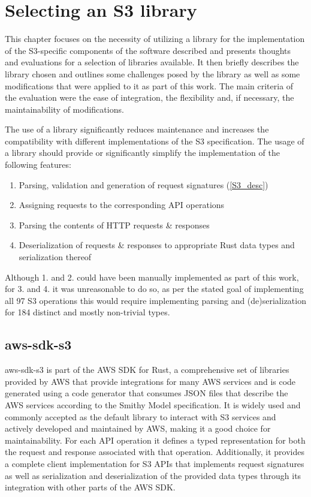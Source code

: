 \chapter{Selecting an S3 library}

This chapter focuses on the necessity of utilizing a library for the implementation of the S3-specific components of the software described and presents thoughts and evaluations for a selection of libraries available. It then briefly describes the library chosen and outlines some challenges posed by the library as well as some modifications that were applied to it as part of this work. The main criteria of the evaluation were the ease of integration, the flexibility and, if necessary, the maintainability of modifications.

The use of a library significantly reduces maintenance and increases the compatibility with different implementations of the S3 specification. The usage of a library should provide or significantly simplify the implementation of the following features:
\begin{enumerate}
	\item Parsing, validation and generation of request signatures (\ref{S3_desc})
	\item Assigning requests to the corresponding API operations
	\item Parsing the contents of HTTP requests \& responses
	\item \label{types_deser} Deserialization of requests \& responses to appropriate Rust data types and serialization thereof
\end{enumerate}

Although 1. and 2. could have been manually implemented as part of this work, for 3. and 4. it was unreasonable to do so, as per the stated goal of implementing all 97 S3 operations this would require implementing parsing and (de)serialization for 184 distinct and mostly non-trivial types.

\section{aws-sdk-s3}

aws-sdk-s3 is part of the AWS SDK for Rust, a comprehensive set of libraries provided by AWS that provide integrations for many AWS services and is code generated using a code generator that consumes JSON files that describe the AWS services according to the Smithy Model specification\cite{AWS_SDK_GITHUB}. It is widely used and commonly accepted as the default library to interact with S3 services\cite{} and actively developed and maintained by AWS, making it a good choice for maintainability. For each API operation it defines a typed representation for both the request and response associated with that operation. Additionally, it provides a complete client implementation for S3 APIs that implements request signatures as well as serialization and deserialization of the provided data types through its integration with other parts of the AWS SDK. 

